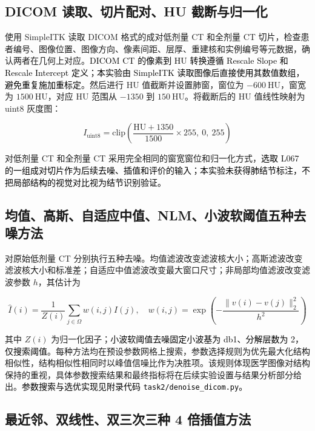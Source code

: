 \documentclass[10.5pt,compsoc,UTF8]{CjC}
\newcommand{\added}[1]{\textcolor{black}{#1}}
\newcommand{\redcite}[1]{{\color{black}\cite{#1}}}
\theoremstyle{mystyle}
\begin{document}
\subsection{DICOM 读取、切片配对、HU 截断与归一化}

使用 SimpleITK 读取 DICOM 格式的成对低剂量 CT 和全剂量 CT 切片，检查患者编号、图像位置、图像方向、像素间距、层厚、重建核和实例编号等元数据，确认两者在几何上对应。\added{DICOM CT 的像素到 HU 转换遵循 Rescale Slope 和 Rescale Intercept 定义；本实验由 SimpleITK 读取图像后直接使用其数值数组，避免重复施加重标定}\redcite{dicom2026ct}。然后进行 HU 值截断并设置肺窗，窗位为 \(-600\ \mathrm{HU}\)，窗宽为 \(1500\ \mathrm{HU}\)，对应 HU 范围从 \(-1350\) 到 \(150\ \mathrm{HU}\)。将截断后的 HU 值线性映射为 uint8 灰度图：

\begin{equation}
I_{\mathrm{uint8}}=\mathrm{clip}\left(\frac{\mathrm{HU}+1350}{1500}\times255,\ 0,\ 255\right)
\end{equation}

对低剂量 CT 和全剂量 CT 采用完全相同的窗宽窗位和归一化方式，\added{选取 L067 的一组成对切片作为后续去噪、插值和评价的输入；本实验未获得肺结节标注，不把局部结构的视觉对比视为结节识别验证。}

\subsection{均值、高斯、自适应中值、NLM、小波软阈值五种去噪方法}

对原始低剂量 CT 分别执行五种去噪。均值滤波改变滤波核大小；高斯滤波改变滤波核大小和标准差；自适应中值滤波改变最大窗口尺寸；非局部均值滤波改变滤波参数 \(h\)，其估计为\redcite{buades2005nlm}

\begin{equation}
\hat{I}(i)=\frac{1}{Z(i)}\sum_{j\in \Omega} w(i,j)I(j),\quad
w(i,j)=\exp\left(-\frac{\|v(i)-v(j)\|_2^2}{h^2}\right)
\end{equation}

其中 \(Z(i)\) 为归一化因子；\added{小波软阈值去噪固定小波基为 db1、分解层数为 2，仅搜索阈值}\redcite{donoho1995denoising}。每种方法均在预设参数网格上搜索，参数选择规则为优先最大化结构相似性，结构相似性相同时以峰值信噪比作为决胜项。该规则体现医学图像对结构保持的重视，具体参数搜索结果和最终指标将在后续实验设置与结果分析部分给出。\added{参数搜索与选优实现见附录代码 \texttt{task2/denoise\_dicom.py}。}

\subsection{最近邻、双线性、双三次三种 4 倍插值方法}
\end{document}
